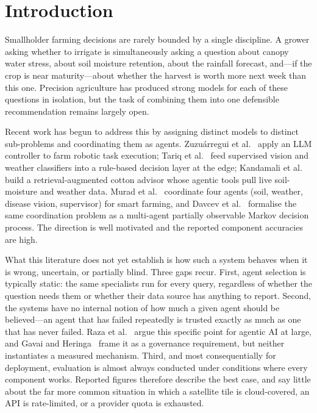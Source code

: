 \documentclass[preprint,12pt]{elsarticle}
\begin{document}
\section{Introduction}
\label{sec:intro}

Smallholder farming decisions are rarely bounded by a single discipline. A
grower asking whether to irrigate is simultaneously asking a question about
canopy water stress, about soil moisture retention, about the rainfall
forecast, and---if the crop is near maturity---about whether the harvest is
worth more next week than this one. Precision agriculture has produced
strong models for each of these questions in isolation, but the task of
combining them into one defensible recommendation remains largely open.

Recent work has begun to address this by assigning distinct models to
distinct sub-problems and coordinating them as agents. Zuzu\'arregui et
al.~\cite{zuzuarregui2025oneforall} apply an LLM controller to farm robotic
task execution; Tariq et al.~\cite{tariq2025edge} feed supervised vision and
weather classifiers into a rule-based decision layer at the edge; Kandamali
et al.~\cite{kandamali2025cottonbot} build a retrieval-augmented cotton
advisor whose agentic tools pull live soil-moisture and weather data. Murad
et al.~\cite{murad2026agentic} coordinate four agents (soil, weather,
disease vision, supervisor) for smart farming, and Davcev et
al.~\cite{davcev2026multiagent} formalise the same coordination problem as a
multi-agent partially observable Markov decision process. The direction is
well motivated and the reported component accuracies are high.

What this literature does not yet establish is how such a system behaves
when it is wrong, uncertain, or partially blind. Three gaps recur. First,
agent selection is typically static: the same specialists run for every
query, regardless of whether the question needs them or whether their data
source has anything to report. Second, the systems have no internal notion
of how much a given agent should be believed---an agent that has failed
repeatedly is trusted exactly as much as one that has never failed. Raza et
al.~\cite{raza2025trism} argue this specific point for agentic AI at large,
and Gavai and Heringa~\cite{gavai2025agentic} frame it as a governance
requirement, but neither instantiates a measured mechanism. Third, and most
consequentially for deployment, evaluation is almost always conducted under
conditions where every component works. Reported figures therefore describe
the best case, and say little about the far more common situation in which
a satellite tile is cloud-covered, an API is rate-limited, or a provider
quota is exhausted.
\end{document}
